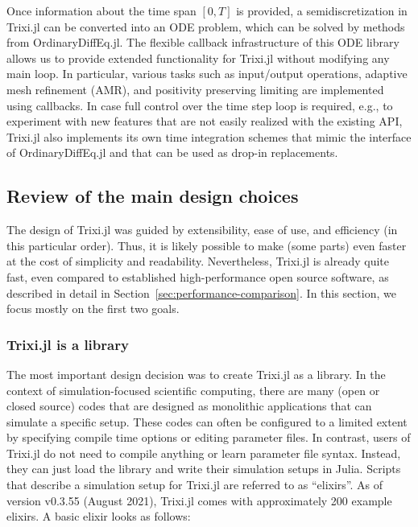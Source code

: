 \documentclass[hidelinks]{juliacon} %
\newcommand{\trixi}{Trixi.jl\xspace}
\begin{document}
Once information about the time span $[0, T]$ is provided, a semidiscretization
in \trixi can be converted into an ODE problem, which can be solved by methods
from OrdinaryDiffEq.jl. The flexible callback infrastructure of this ODE library
allows us to provide extended functionality for \trixi without modifying any
main loop. In particular, various tasks such as input/output operations, adaptive
mesh refinement (AMR), and positivity preserving limiting are implemented using
callbacks. In case full control over the time step loop is required, e.g., to experiment with new
features that are not easily realized with the existing API, \trixi also implements its own time
integration schemes that mimic the interface of OrdinaryDiffEq.jl and that can be used as drop-in
replacements.


\subsection{Review of the main design choices}

The design of \trixi was guided by extensibility, ease of use, and efficiency
(in this particular order). Thus, it is likely possible to make (some parts) even
faster at the cost of simplicity and readability. Nevertheless, \trixi is already quite
fast, even compared to established high-performance open source software,
as described in detail in Section~\ref{sec:performance-comparison}. In this
section, we focus mostly on the first two goals.

\subsubsection{\trixi is a library}

The most important design decision was to create \trixi as a library. In the
context of simulation-focused scientific computing, there are many (open
or closed source) codes that are designed as monolithic applications that can
simulate a specific setup. These codes can often be configured to a limited extent
by specifying compile time options or editing parameter files. In contrast, users of
\trixi do not need to compile anything or learn parameter file syntax. Instead, they can
just load the library and write their simulation setups in Julia. Scripts that describe
a simulation setup for \trixi are referred to as ``elixirs''. As of version
v0.3.55 (August 2021), \trixi comes with approximately 200 example elixirs. A basic elixir
looks as follows:
\end{document}
